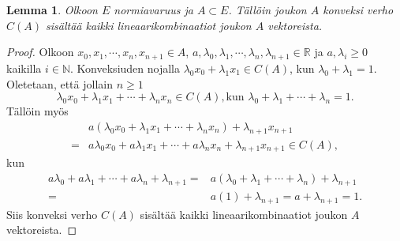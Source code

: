 \documentclass[12pt,a4paper,leqno]{report}
\newcommand{\R}{\mathbb{R}}
\newcommand{\N}{\mathbb{N}}
\theoremstyle{plain}
\newtheorem{lem}[equation]{Lemma}
\theoremstyle{definition}
\theoremstyle{remark}
\begin{document}
\begin{lem} Olkoon $E$ normiavaruus ja $A\subset E$. Tällöin joukon $A$ konveksi verho $C(A)$ sisältää kaikki lineaarikombinaatiot joukon $A$ vektoreista. 
\end{lem}

\begin{proof}
Olkoon $x_0,x_1,\cdots, x_n, x_{n+1} \in A$, $a,\lambda_0,\lambda_1,\cdots, \lambda_n, \lambda_{n+1} \in \R$ ja $a,\lambda_i\geq 0$ kaikilla $ i\in\N$. Konveksiuden nojalla 
$\lambda_0 x_0+\lambda_1 x_1 \in C(A)$, kun $\lambda_0 +\lambda_1=1$.
Oletetaan, että jollain $n\geq 1$ 
\begin{equation*}
\lambda_0 x_0+\lambda_1 x_1+\cdots+\lambda_{n} x_{n}\in C(A), \text{kun } \lambda_0+\lambda_1+\cdots+ \lambda_{n} =1.
 \end{equation*}
Tällöin myös
\begin{equation*}
\begin{split}
&a(\lambda_0 x_0+\lambda_1 x_1+\cdots+\lambda_{n}x_n)+\lambda_{n+1} x_{n+1}\\=&a\lambda_0 x_0+a\lambda_1 x_1+\cdots+a\lambda_{n}x_n+\lambda_{n+1} x_{n+1}
\in C(A),
\end{split}
\end{equation*}
kun 
\begin{equation*}
\begin{split}
a\lambda_0+a\lambda_1+\cdots+ a\lambda_{n}+ \lambda_{n+1}=&a(\lambda_0+\lambda_1+\cdots+ \lambda_{n})+ \lambda_{n+1}\\=&a(1)+ \lambda_{n+1}=a+ \lambda_{n+1}=1.
\end{split}
\end{equation*} 
Siis konveksi verho $C(A)$ sisältää kaikki lineaarikombinaatiot joukon $A$ vektoreista.



\end{proof}
\end{document}
